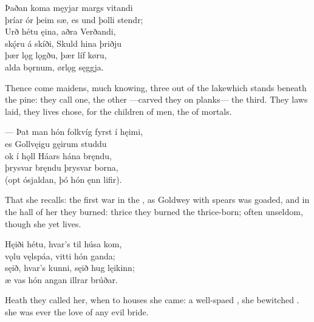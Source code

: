\bva Þaðan koma męyjar \hld margs vitandi \\%
þríar ór þeim sæ\footnotemark[1], \hld es und þolli stendr; \\%
Urð hétu ęina, \hld aðra Verðandi, \\%
skǫ́ru á skíði, \hld Skuld hina þriðju \\%
þær lǫg lǫgðu, \hld þær líf køru, \\%
alda bǫrnum, \hld ørlǫg sęggja.\eva
{}

\bvb Thence come maidens, much knowing, three out of the lake\footnotemark[1] which stands beneath the pine\footnotemark[2]:  they call one, the other —carved they on planks— the third. They laws laid, they lives chose, for the children of men, the  of mortals.\evb
{}


\bva — Þat man hón folkvíg \hld fyrst í hęimi, \\%
es Gollvęigu \hld gęirum studdu \\%
ok í hǫll Háars \hld hána bręndu, \\%
þrysvar bręndu \hld þrysvar borna, \\%
(opt ósjaldan, \hld þó hón ęnn lifir).\footnotemark[1]\eva
{}

\bvb That she recalls: the first war in the , as Goldwey with spears was goaded, and in the hall of \footnotemark[1] her they burned: thrice they burned the thrice-born; often unseldom, though she yet lives.\footnotemark[2]\evb
{}

\bva Hęiði hétu, \hld hvar’s til húsa kom, \\%
vǫlu vęlspáa, \hld vitti hón ganda; \\%
sęið, hvar’s kunni, \hld sęið hug lęikinn; \\%
æ vas hón angan \hld illrar brúðar.\eva

\bvb Heath they called her, when to houses she came: a well-spaed , she bewitched . she was ever the love of any evil bride.\evb

